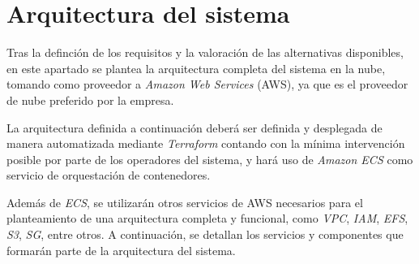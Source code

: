 \newpage{}
\section{Arquitectura del sistema}\label{sec:arquitectura}
Tras la definción de los requisitos y la valoración de las alternativas
disponibles, en este apartado se plantea la arquitectura completa del sistema
en la nube, tomando como proveedor a \textit{Amazon Web Services} (AWS), ya que
es el proveedor de nube preferido por la empresa.

La arquitectura definida a continuación deberá ser definida y desplegada de
manera automatizada mediante \textit{Terraform} contando con la mínima
intervención posible por parte de los operadores del sistema, y hará uso de
\textit{Amazon ECS} como servicio de orquestación de contenedores.

Además de \textit{ECS}, se utilizarán otros servicios de AWS necesarios para el
planteamiento de una arquitectura completa y funcional, como \textit{VPC},
\textit{IAM}, \textit{EFS}, \textit{S3}, \textit{SG}, entre otros. A
continuación, se detallan los servicios y componentes que formarán parte de la
arquitectura del sistema.

